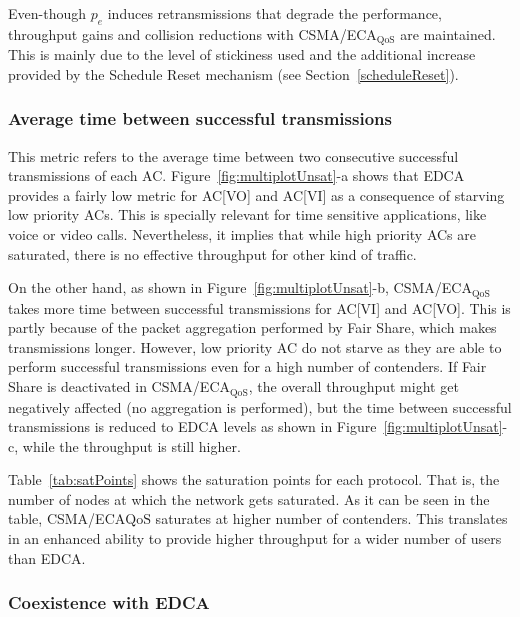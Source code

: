 Even-though $p_e$ induces retransmissions that degrade the performance, throughput gains and collision reductions with CSMA/ECA$_{\text{QoS}}$ are maintained. This is mainly due to the level of stickiness used and the additional increase provided by the Schedule Reset mechanism (see Section~\ref{scheduleReset}).

\subsubsection{Average time between successful transmissions}
This metric refers to the average time between two consecutive successful transmissions of each AC. Figure~\ref{fig:multiplotUnsat}-a shows that EDCA provides a fairly low metric for AC[VO] and AC[VI] as a consequence of  starving low priority ACs. This is specially relevant for time sensitive applications, like voice or video calls. Nevertheless, it implies that while high priority ACs are saturated, there is no effective throughput for other kind of traffic.

On the other hand, as shown in Figure~\ref{fig:multiplotUnsat}-b, CSMA/ECA$_{\text{QoS}}$ takes more time between successful transmissions for AC[VI] and AC[VO]. This is partly because of the packet aggregation performed by Fair Share, which makes transmissions longer. However, low priority AC do not starve as they are able to perform successful transmissions even for a high number of contenders. If Fair Share is deactivated in CSMA/ECA$_{\text{QoS}}$, the overall throughput might get negatively affected (no aggregation is performed), but the time between successful transmissions is reduced to EDCA levels as shown in Figure~\ref{fig:multiplotUnsat}-c, while the throughput is still higher.


Table~\ref{tab:satPoints} shows the saturation points for each protocol. That is, the number of nodes at which the network gets saturated. As it can be seen in the table, CSMA/ECA${\text{QoS}}$ saturates at higher number of contenders. This translates in an enhanced ability to provide higher throughput for a wider number of users than EDCA.

\subsubsection{Coexistence with EDCA}

